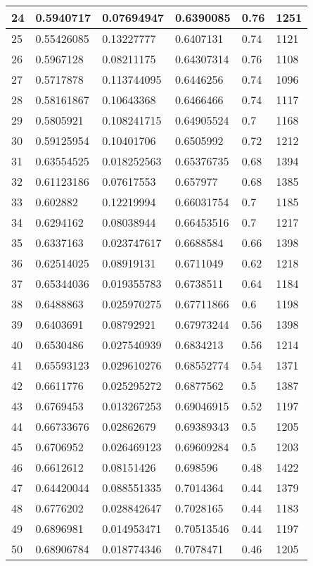 \begin{longtable}{|l|l|l|l|l|l|}
24 & 0.5940717 & 0.07694947 & 0.6390085 & 0.76 & 1251 \\ \hline 
25 & 0.55426085 & 0.13227777 & 0.6407131 & 0.74 & 1121 \\ \hline 
26 & 0.5967128 & 0.08211175 & 0.64307314 & 0.76 & 1108 \\ \hline 
27 & 0.5717878 & 0.113744095 & 0.6446256 & 0.74 & 1096 \\ \hline 
28 & 0.58161867 & 0.10643368 & 0.6466466 & 0.74 & 1117 \\ \hline 
29 & 0.5805921 & 0.108241715 & 0.64905524 & 0.7 & 1168 \\ \hline 
30 & 0.59125954 & 0.10401706 & 0.6505992 & 0.72 & 1212 \\ \hline 
31 & 0.63554525 & 0.018252563 & 0.65376735 & 0.68 & 1394 \\ \hline 
32 & 0.61123186 & 0.07617553 & 0.657977 & 0.68 & 1385 \\ \hline 
33 & 0.602882 & 0.12219994 & 0.66031754 & 0.7 & 1185 \\ \hline 
34 & 0.6294162 & 0.08038944 & 0.66453516 & 0.7 & 1217 \\ \hline 
35 & 0.6337163 & 0.023747617 & 0.6688584 & 0.66 & 1398 \\ \hline 
36 & 0.62514025 & 0.08919131 & 0.6711049 & 0.62 & 1218 \\ \hline 
37 & 0.65344036 & 0.019355783 & 0.6738511 & 0.64 & 1184 \\ \hline 
38 & 0.6488863 & 0.025970275 & 0.67711866 & 0.6 & 1198 \\ \hline 
39 & 0.6403691 & 0.08792921 & 0.67973244 & 0.56 & 1398 \\ \hline 
40 & 0.6530486 & 0.027540939 & 0.6834213 & 0.56 & 1214 \\ \hline 
41 & 0.65593123 & 0.029610276 & 0.68552774 & 0.54 & 1371 \\ \hline 
42 & 0.6611776 & 0.025295272 & 0.6877562 & 0.5 & 1387 \\ \hline 
43 & 0.6769453 & 0.013267253 & 0.69046915 & 0.52 & 1197 \\ \hline 
44 & 0.66733676 & 0.02862679 & 0.69389343 & 0.5 & 1205 \\ \hline 
45 & 0.6706952 & 0.026469123 & 0.69609284 & 0.5 & 1203 \\ \hline 
46 & 0.6612612 & 0.08151426 & 0.698596 & 0.48 & 1422 \\ \hline 
47 & 0.64420044 & 0.088551335 & 0.7014364 & 0.44 & 1379 \\ \hline 
48 & 0.6776202 & 0.028842647 & 0.7028165 & 0.44 & 1183 \\ \hline 
49 & 0.6896981 & 0.014953471 & 0.70513546 & 0.44 & 1197 \\ \hline 
50 & 0.68906784 & 0.018774346 & 0.7078471 & 0.46 & 1205 \\ \hline 
\end{longtable}